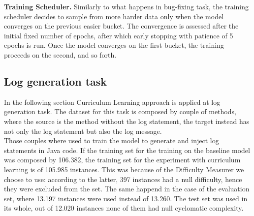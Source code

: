 \noindent\textbf{Training Scheduler.} Similarly to what happens in bug-fixing task, the training scheduler decides to sample from more harder data only when the model converges on the 
previous easier bucket. The convergence is assessed after the initial fixed number of epochs, after which early stopping with patience of 5 epochs
is run. Once the model converges on the first bucket, the training proceeds on the second, and so forth. 

\subsection{Log generation task}
In the following section Curriculum Learning approach 
is applied at log generation task.
The dataset for this task is composed by couple of methods, where the source is the method without the log statement,
the target instead has not only the log statement but also the log message.\\
Those couples where used to train the model to generate and inject log statements in Java code.
If the training set for the training on the baseline model was composed by 106.382, the training set for the experiment with curriculum learning 
is of 105.985 instances. This was because of the Difficulty Measurer we choose to use: according to the latter, 397 instances had a null difficulty, hence
they were excluded from the set. The same happend in the case of the evaluation set, 
where 13.197 instances were used instead of 13.260. The test set was used in its whole, out of 12.020 instances
none of them had null cyclomatic complexity.
\newline


